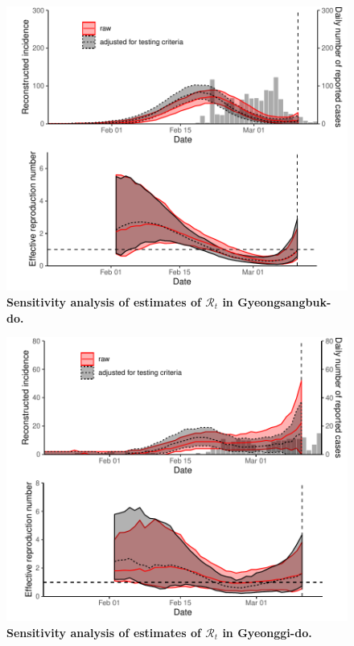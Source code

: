 \pagebreak

\begin{figure}[!ht]
\includegraphics[width=\textwidth]{figure_R_t_gyeongbuk.pdf}
\caption{
\textbf{Sensitivity analysis of estimates of $\mathcal R_t$ in Gyeongsangbuk-do.}
}
\end{figure}

\pagebreak

\begin{figure}[!ht]
\includegraphics[width=\textwidth]{figure_R_t_gyeonggi.pdf}
\caption{
\textbf{Sensitivity analysis of estimates of $\mathcal R_t$ in Gyeonggi-do.}
}
\end{figure}

